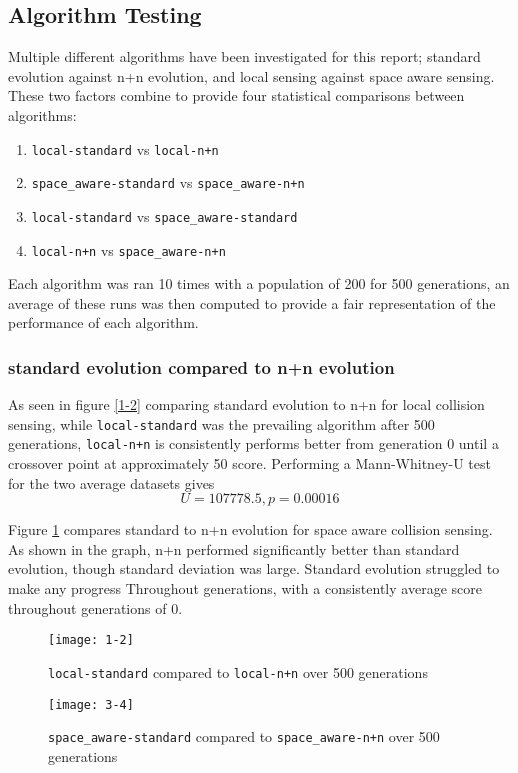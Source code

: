 \subsection{Algorithm Testing}
Multiple different algorithms have been investigated for this report; standard evolution against n+n evolution, and local sensing against space aware sensing. These two factors combine to provide four statistical comparisons between algorithms:
\begin{enumerate}
  \item \verb|local-standard| vs \verb|local-n+n|
  \item \verb|space_aware-standard| vs \verb|space_aware-n+n|
  \item \verb|local-standard| vs \verb|space_aware-standard|
  \item \verb|local-n+n| vs \verb|space_aware-n+n|
\end{enumerate}
Each algorithm was ran 10 times with a population of 200 for 500 generations, an average of these runs was then computed to provide a fair representation of the performance of each algorithm. 

\subsubsection{standard evolution compared to n+n evolution}

As seen in figure \ref{1-2} comparing standard evolution to n+n for local collision sensing, while \verb|local-standard| was the prevailing algorithm after 500 generations, \verb|local-n+n| is consistently performs better from generation 0 until a crossover point at approximately 50 score. Performing a Mann-Whitney-U test for the two average datasets gives 
$$
U = 107778.5, p = 0.00016
$$

Figure \ref{3-4} compares standard to n+n evolution for space aware collision sensing. As shown in the graph, n+n performed significantly better than standard evolution, though standard deviation was large. Standard evolution struggled to make any progress Throughout generations, with a consistently average score throughout generations of 0.

\begin{figure}[h]
  \centering
  \begin{minipage}{.5\textwidth}
    \centering
    \captionsetup{width=.8\linewidth}
    \texttt{[image: 1-2]}
    \caption{\texttt{local-standard} compared to \texttt{local-n+n} over 500 generations}
    \label{1-2}
  \end{minipage}%
  \begin{minipage}{.5\textwidth}
    \centering
    \captionsetup{width=.8\linewidth}
    \texttt{[image: 3-4]}
    \caption{\texttt{space\_aware-standard} compared to \texttt{space\_aware-n+n} over 500 generations}
    \label{3-4}
  \end{minipage}
\end{figure}


